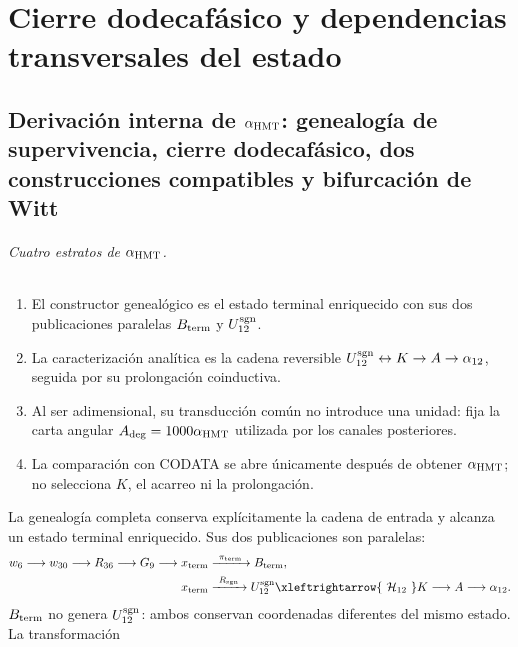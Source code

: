 \part{Cierre dodecafásico y dependencias transversales del estado}

\chapter[Derivación interna de la constante de estructura fina]{Derivación
interna de \texorpdfstring{\(\alpha_{\rm HMT}\)}{alpha HMT}: genealogía de
supervivencia, cierre dodecafásico, dos construcciones compatibles y
bifurcación de Witt}
\label{chap:alpha-rev7}

\paragraph{Cuatro estratos de \(\alpha_{\rm HMT}\).}
\begin{enumerate}
 \item El constructor genealógico es el estado terminal enriquecido con sus
 dos publicaciones paralelas \(B_{\rm term}\) y \(U_{12}^{\rm sgn}\).
 \item La caracterización analítica es la cadena reversible
 \(U_{12}^{\rm sgn}\leftrightarrow K\to A\to\alpha_{12}\), seguida por su
 prolongación coinductiva.
 \item Al ser adimensional, su transducción común no introduce una unidad:
 fija la carta angular \(A_{\rm deg}=1000\alpha_{\rm HMT}\) utilizada por
 los canales posteriores.
 \item La comparación con CODATA se abre únicamente después de obtener
 \(\alpha_{\rm HMT}\); no selecciona \(K\), el acarreo ni la prolongación.
\end{enumerate}
La genealogía completa conserva explícitamente la cadena de entrada y alcanza
un estado terminal enriquecido. Sus dos publicaciones son paralelas:
\[
\begin{aligned}
 w_6\longrightarrow w_{30}\longrightarrow R_{36}\longrightarrow G_9
 \longrightarrow x_{\rm term}
 &\xrightarrow{\ \pi_{\rm term}\ }B_{\rm term},\\
 x_{\rm term}
 &\xrightarrow{\ R_{\rm sgn}\ }U_{12}^{\rm sgn}
 \xleftrightarrow{\ \mathcal H_{12}\ }K
 \longrightarrow A\longrightarrow\alpha_{12}.
\end{aligned}
\]
\(B_{\rm term}\) no genera \(U_{12}^{\rm sgn}\): ambos conservan
coordenadas diferentes del mismo estado. La transformación
